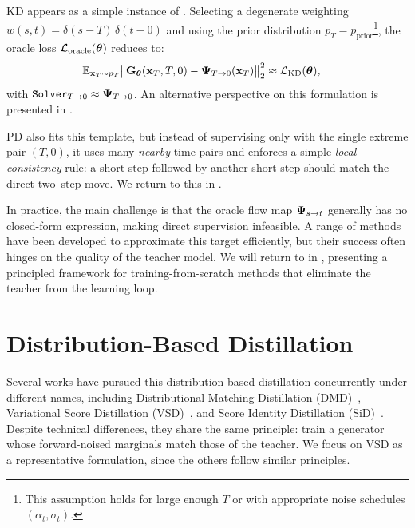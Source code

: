 KD appears as a simple instance of
. Selecting a degenerate weighting
$w(s,t)=\delta(s{-}T)\,\delta(t{-}0)$ and using the prior distribution
$p_T=p_{\mathrm{prior}}$\footnote{This assumption holds for large enough $T$ or
with appropriate noise schedules $(\alpha_t,\sigma_t)$.}, the oracle loss $\mathcal{L}_{\mathrm{oracle}}({\bm{\theta}})$ reduces to:
\[
\mathbb{E}_{{\mathbf{x}}_T\sim p_T}
\big\|{\mathbf{G}}_{\bm{\theta}}({\mathbf{x}}_T,T,0)-{\bm{\Psi}}_{T\to 0}({\mathbf{x}}_T)\big\|_2^2
\approx \mathcal{L}_{\mathrm{KD}}({\bm{\theta}}),
\quad
\]
with $\mathtt{Solver}_{T\to 0}\approx{\bm{\Psi}}_{T\to 0}$. An alternative perspective on this formulation is presented in .


PD also fits this template, but instead of supervising only with the single extreme pair $(T,0)$, it uses many \emph{nearby} time pairs and enforces a simple \emph{local consistency} rule:
a short step followed by another short step should match the direct two–step move. We return to this in .

In practice, the main challenge is that the oracle flow map ${\bm{\Psi}}_{s\to t}$ generally has no closed-form expression, making direct supervision infeasible.  A range of methods have been developed to approximate this
target efficiently, but their success often hinges on the quality of the teacher
model. We will return to  in , presenting a principled framework for training-from-scratch methods that eliminate the teacher from the learning loop.








\clearpage
\newpage



\section{\texorpdfstring{Distribution-Based Distillation}{Distribution-Based Distillation}}\label{sec:VSD}


Several works have pursued this distribution-based distillation concurrently under different names,
including Distributional Matching Distillation (DMD)~\citep{yin2024one,yin2024improved},
Variational Score Distillation (VSD)~\citep{pooledreamfusion,wang2023prolificdreamer,luo2023diff,lu2024simplifying},
and Score Identity Distillation (SiD)~\citep{zhou2024score}.
Despite technical differences, they share the same principle:
train a generator whose forward-noised marginals match those of the teacher.
We focus on VSD as a representative formulation, since the others follow similar principles.


